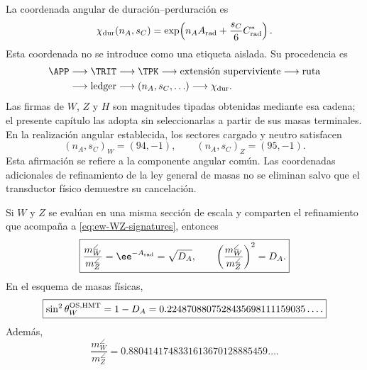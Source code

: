 La coordenada angular de duraci\'on--perduraci\'on es
\begin{equation}
\label{eq:ew-angular-character}
\chi_{\rm dur}(n_A,s_C)
=\exp\!\left(n_AA_{\rm rad}
+\frac{s_C}{6}C^*_{\rm rad}\right).
\end{equation}
Esta coordenada no se introduce como una etiqueta aislada. Su procedencia es
\begin{equation}
\label{eq:ew-signature-provenance}
\begin{aligned}
\APP&\longrightarrow\TRIT\longrightarrow\TPK
\longrightarrow\text{extensión superviviente}
\longrightarrow\text{ruta}\\
&\longrightarrow\text{ledger}
\longrightarrow(n_A,s_C,\ldots)
\longrightarrow\chi_{\rm dur}.
\end{aligned}
\end{equation}
Las firmas de \(W\), \(Z\) y \(H\) son magnitudes tipadas obtenidas mediante
esa cadena; el presente cap\'itulo las adopta sin seleccionarlas a partir de
sus masas terminales. En la realizaci\'on angular establecida, los sectores
cargado y neutro satisfacen
\begin{equation}
\label{eq:ew-WZ-signatures}
(n_A,s_C)_W=(94,-1),
\qquad
(n_A,s_C)_Z=(95,-1).
\end{equation}
Esta afirmaci\'on se refiere a la componente angular com\'un. Las
coordenadas adicionales de refinamiento de la ley general de masas no se
eliminan salvo que el transductor f\'isico demuestre su cancelaci\'on.

\begin{theorem}
\label{thm:ew-weinberg}
Si \(W\) y \(Z\) se eval\'uan en una misma secci\'on de escala y comparten
el refinamiento que acompa\~na a \cref{eq:ew-WZ-signatures}, entonces
\begin{equation}
\label{eq:ew-WZ-ratio}
\boxed{
\frac{m_W^{\angle}}{m_Z^{\angle}}
=\ee^{-A_{\rm rad}}=\sqrt{D_A},
\qquad
\left(\frac{m_W^{\angle}}{m_Z^{\angle}}\right)^2=D_A.}
\end{equation}
En el esquema de masas f\'isicas,
\begin{equation}
\label{eq:ew-sin2thetaW}
\boxed{
\sin^2\theta_W^{\rm OS,HMT}=1-D_A
=0.2248708807528435698111159035\ldots .}
\end{equation}
Adem\'as,
\begin{equation}
\label{eq:ew-WZ-terminal-ratio}
\frac{m_W^{\angle}}{m_Z^{\angle}}
=0.8804141748331613670128885459\ldots .
\end{equation}
\end{theorem}

